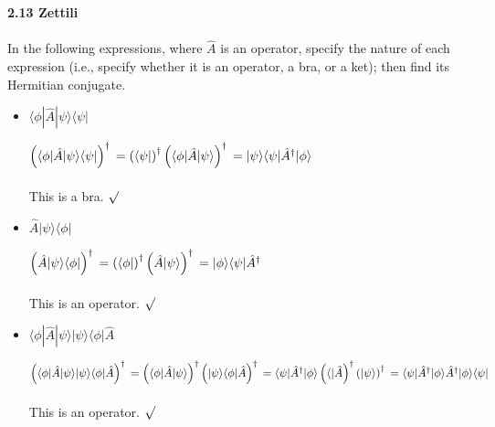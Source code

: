 \documentclass[fleqn]{article}
\begin{document}
  \textbf{2.13 Zettili} \\ \\
  In the following expressions, where $\hat{A}$ is an operator, specify the nature of each expression 
  (i.e., specify whether it is an operator, a bra, or a ket); then find its Hermitian conjugate.
  \begin{itemize}
    \item $\langle \phi | \hat{A} | \psi \rangle \langle  \psi |$

      \textcolor{hwColor}{
        $
          \left(\langle \phi | \hat{A} | \psi \rangle \langle  \psi |\right)^{\dagger} \\
          \\
          =\left(\langle \psi | \right)^{\dagger} \left(\langle \phi | \hat{A} | \psi \rangle\right)^{\dagger} \\
          \\
          =| \psi \rangle \langle \psi | \hat{A}^{\dagger} | \phi \rangle
        $ 
        \\
        \\
        This is a bra.  $\surd$
      }

    \item $\hat{A} | \psi \rangle \langle \phi |$

      \textcolor{hwColor}{
        $
          \left(\hat{A} | \psi \rangle \langle \phi |\right)^{\dagger} \\
          \\
          =\left(\langle \phi |\right)^{\dagger} \left(\hat{A} | \psi \rangle\right)^{\dagger}\\
          \\
          =| \phi \rangle \langle \psi | \hat{A}^{\dagger}
        $ 
        \\
        \\
        This is an operator.  $\surd$
      }
    
    \item $\langle \phi | \hat{A} | \psi \rangle | \psi \rangle \langle \phi | \hat{A}$

      \textcolor{hwColor}{
        $
          \left(\langle \phi | \hat{A} | \psi \rangle | \psi \rangle \langle \phi | \hat{A}\right)^{\dagger} \\
          \\
          =\left(\langle \phi | \hat{A} | \psi \rangle\right)^{\dagger} \left(| \psi \rangle \langle \phi | \hat{A}\right)^{\dagger} \\ 
          \\
          =\langle \psi | \hat{A}^{\dagger} | \phi \rangle \left(\langle | \hat{A}\right)^{\dagger} \left(| \psi \rangle\right)^{\dagger} \\
          \\
          =\langle \psi | \hat{A}^{\dagger} | \phi \rangle \hat{A}^{\dagger} | \phi \rangle \langle \psi |
        $
        \\
        \\
        This is an operator. $\surd$
      }
    

\end{itemize}
\end{document}

